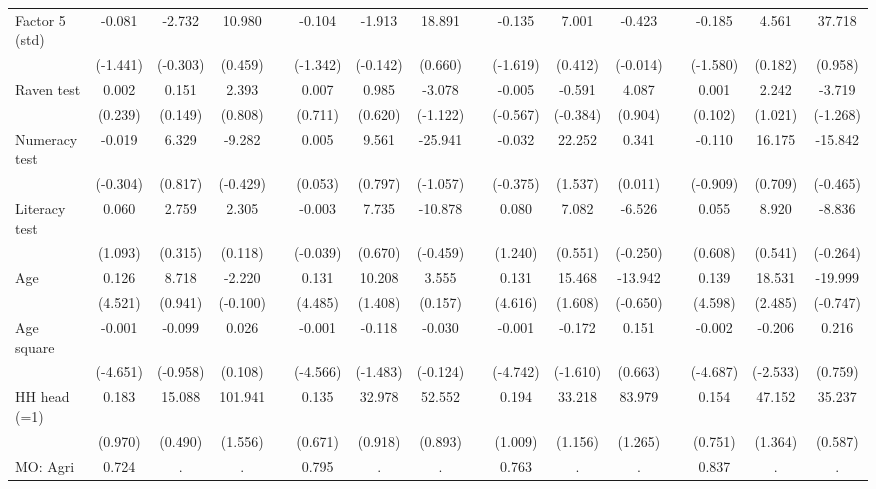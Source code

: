 {\begin{longtable}{@{\extracolsep{\fill}}lccccccccccccccc}
    Factor 5 (std) & -0.081 & -2.732 & 10.980 &   & -0.104 & -1.913 & 18.891 &   & -0.135 & 7.001 & -0.423 &   & -0.185 & 4.561 & 37.718 \\
      & (-1.441) & (-0.303) & (0.459) &   & (-1.342) & (-0.142) & (0.660) &   & (-1.619) & (0.412) & (-0.014) &   & (-1.580) & (0.182) & (0.958) \\
    Raven test & 0.002 & 0.151 & 2.393 &   & 0.007 & 0.985 & -3.078 &   & -0.005 & -0.591 & 4.087 &   & 0.001 & 2.242 & -3.719 \\
      & (0.239) & (0.149) & (0.808) &   & (0.711) & (0.620) & (-1.122) &   & (-0.567) & (-0.384) & (0.904) &   & (0.102) & (1.021) & (-1.268) \\
    Numeracy test & -0.019 & 6.329 & -9.282 &   & 0.005 & 9.561 & -25.941 &   & -0.032 & 22.252 & 0.341 &   & -0.110 & 16.175 & -15.842 \\
      & (-0.304) & (0.817) & (-0.429) &   & (0.053) & (0.797) & (-1.057) &   & (-0.375) & (1.537) & (0.011) &   & (-0.909) & (0.709) & (-0.465) \\
    Literacy test & 0.060 & 2.759 & 2.305 &   & -0.003 & 7.735 & -10.878 &   & 0.080 & 7.082 & -6.526 &   & 0.055 & 8.920 & -8.836 \\
      & (1.093) & (0.315) & (0.118) &   & (-0.039) & (0.670) & (-0.459) &   & (1.240) & (0.551) & (-0.250) &   & (0.608) & (0.541) & (-0.264) \\
    Age & 0.126 & 8.718 & -2.220 &   & 0.131 & 10.208 & 3.555 &   & 0.131 & 15.468 & -13.942 &   & 0.139 & 18.531 & -19.999 \\
      & (4.521) & (0.941) & (-0.100) &   & (4.485) & (1.408) & (0.157) &   & (4.616) & (1.608) & (-0.650) &   & (4.598) & (2.485) & (-0.747) \\
    Age square & -0.001 & -0.099 & 0.026 &   & -0.001 & -0.118 & -0.030 &   & -0.001 & -0.172 & 0.151 &   & -0.002 & -0.206 & 0.216 \\
      & (-4.651) & (-0.958) & (0.108) &   & (-4.566) & (-1.483) & (-0.124) &   & (-4.742) & (-1.610) & (0.663) &   & (-4.687) & (-2.533) & (0.759) \\
    HH head (=1) & 0.183 & 15.088 & 101.941 &   & 0.135 & 32.978 & 52.552 &   & 0.194 & 33.218 & 83.979 &   & 0.154 & 47.152 & 35.237 \\
      & (0.970) & (0.490) & (1.556) &   & (0.671) & (0.918) & (0.893) &   & (1.009) & (1.156) & (1.265) &   & (0.751) & (1.364) & (0.587) \\
    MO: Agri & 0.724 & . & . &   & 0.795 & . & . &   & 0.763 & . & . &   & 0.837 & . & . \\

\end{longtable}}
